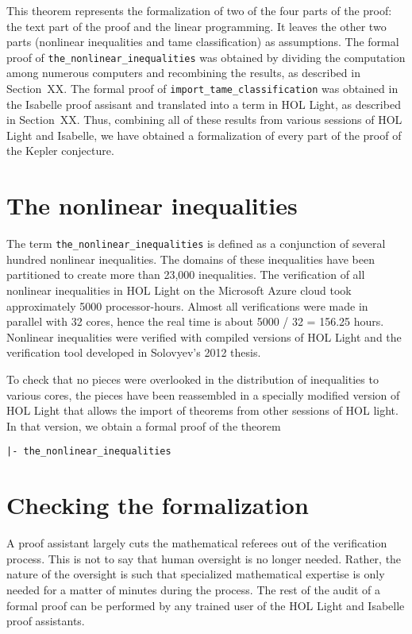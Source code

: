 This theorem represents the formalization of two of the four parts of
the proof: the text part of the proof and the linear programming.  It
leaves the other two parts (nonlinear inequalities and tame
classification) as assumptions.  The formal proof of
\verb!the_nonlinear_inequalities! was obtained by dividing the
computation among numerous computers and recombining the results, as
described in Section~XX.  The formal proof of
\verb!import_tame_classification! was obtained in the Isabelle proof
assisant and translated into a term in HOL Light, as described in
Section~XX.  Thus, combining all of these results from various
sessions of HOL Light and Isabelle, we have obtained a formalization
of every part of the proof of the Kepler conjecture.

\section{The nonlinear inequalities}

The term \verb!the_nonlinear_inequalities! is defined as a conjunction of
several hundred nonlinear inequalities. The domains of these
inequalities have been partitioned to create more than 23,000
inequalities. The verification of all nonlinear inequalities in HOL
Light on the Microsoft Azure cloud took approximately 5000
processor-hours. Almost all verifications were made in parallel with
32 cores, hence the real time is about 5000 / 32 = 156.25
hours. Nonlinear inequalities were verified with compiled versions of
HOL Light and the verification tool developed in Solovyev's 2012
thesis.

To check that no pieces were overlooked in the distribution of
inequalities to various cores, the pieces have been reassembled in a
specially modified version of HOL Light that allows the import of
theorems from other sessions of HOL light. In that version, we obtain
a formal proof of the theorem

\begin{verbatim}
|- the_nonlinear_inequalities
\end{verbatim}


\section{Checking the formalization}

A proof assistant largely cuts the mathematical referees out of the
verification process.  This is not to say that human oversight is no
longer needed.  Rather, the nature of the oversight is such that
specialized mathematical expertise is only needed for a matter of minutes
during the process.  The rest of the audit of a formal proof can be
performed by any trained user of the HOL Light and Isabelle proof
assistants.


